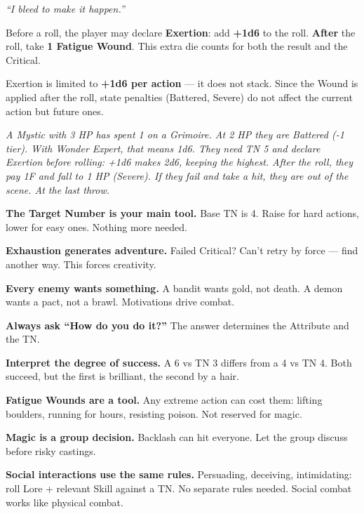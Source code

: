\documentclass[10pt,a4paper]{article}
\begin{document}

\textit{“I bleed to make it happen.”}


Before a roll, the player may declare \textbf{Exertion}: add \textbf{+1d6} to the roll. \textbf{After} the roll, take \textbf{1 Fatigue Wound}. This extra die counts for both the result and the Critical.


Exertion is limited to \textbf{+1d6 per action} — it does not stack. Since the Wound is applied after the roll, state penalties (Battered, Severe) do not affect the current action but future ones.


\textit{A Mystic with 3 HP has spent 1 on a Grimoire. At 2 HP they are Battered (-1 tier). With Wonder Expert, that means 1d6. They need TN 5 and declare Exertion before rolling: +1d6 makes 2d6, keeping the highest. After the roll, they pay 1F and fall to 1 HP (Severe). If they fail and take a hit, they are out of the scene. At the last throw.}




\textbf{The Target Number is your main tool.} Base TN is 4. Raise for hard actions, lower for easy ones. Nothing more needed.


\textbf{Exhaustion generates adventure.} Failed Critical? Can't retry by force — find another way. This forces creativity.


\textbf{Every enemy wants something.} A bandit wants gold, not death. A demon wants a pact, not a brawl. Motivations drive combat.


\textbf{Always ask “How do you do it?”} The answer determines the Attribute and the TN.


\textbf{Interpret the degree of success.} A 6 vs TN 3 differs from a 4 vs TN 4. Both succeed, but the first is brilliant, the second by a hair.


\textbf{Fatigue Wounds are a tool.} Any extreme action can cost them: lifting boulders, running for hours, resisting poison. Not reserved for magic.


\textbf{Magic is a group decision.} Backlash can hit everyone. Let the group discuss before risky castings.


\textbf{Social interactions use the same rules.} Persuading, deceiving, intimidating: roll Lore + relevant Skill against a TN. No separate rules needed. Social combat works like physical combat.

\end{document}
